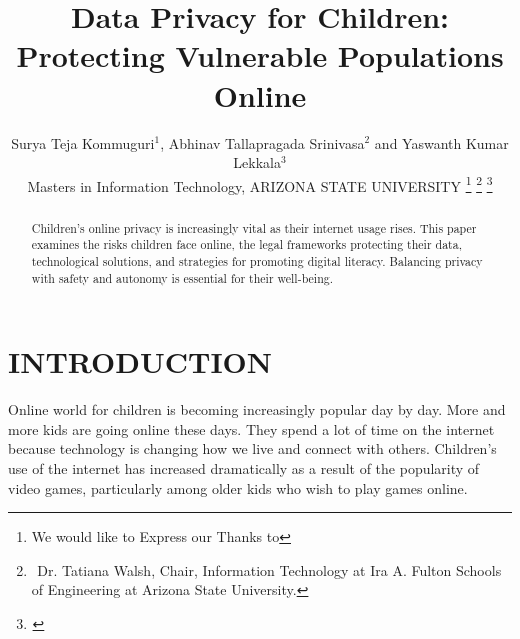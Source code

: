 \documentclass[a4paper, 10 pt, conference]{ieeeconf}  %
\title{\LARGE \bf
Data Privacy for Children: Protecting Vulnerable Populations Online
}
\author{Surya Teja Kommuguri$^{1}$, Abhinav Tallapragada Srinivasa$^{2}$ and Yaswanth Kumar Lekkala$^{3}$%
\\ Masters in Information Technology, ARIZONA STATE UNIVERSITY
\thanks{We would like to Express our Thanks to }%
\thanks{$^{}$ Dr. Tatiana Walsh, Chair, Information Technology at Ira A. Fulton Schools of Engineering at Arizona State University.}%
\thanks{$^{}$
        {\tt\small }}%
}
\begin{document}
\maketitle
\thispagestyle{empty}
\pagestyle{empty}


\begin{abstract}

Children's online privacy is increasingly vital as their internet usage rises. This paper examines the risks children face online, the legal frameworks protecting their data, technological solutions, and strategies for promoting digital literacy. Balancing privacy with safety and autonomy is essential for their well-being.

\end{abstract}


\section{INTRODUCTION}

Online world for children is becoming increasingly popular day by day. More and more kids are going online these days. They spend a lot of time on the internet because technology is changing how we live and connect with others. Children's use of the internet has increased dramatically as a result of the popularity of video games, particularly among older kids who wish to play games online.
\end{document}
